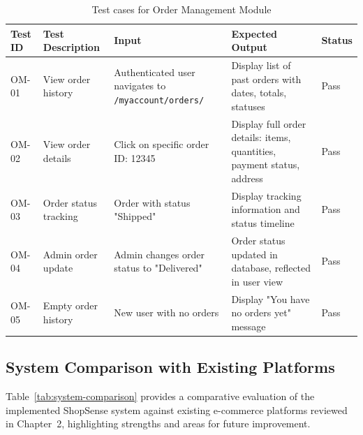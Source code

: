 \begin{table}[H]
\centering
\caption{Test cases for Order Management Module}
\label{tab:test-orders}
\small
\begin{tabular}{|p{1.3cm}|p{3.5cm}|p{3cm}|p{3.5cm}|p{1.2cm}|}
\hline
\textbf{Test ID} & \textbf{Test Description} & \textbf{Input} & \textbf{Expected Output} & \textbf{Status} \\
\hline
OM-01 & View order history & Authenticated user navigates to \texttt{/myaccount/orders/} & Display list of past orders with dates, totals, statuses & Pass \\
\hline
OM-02 & View order details & Click on specific order ID: 12345 & Display full order details: items, quantities, payment status, address & Pass \\
\hline
OM-03 & Order status tracking & Order with status "Shipped" & Display tracking information and status timeline & Pass \\
\hline
OM-04 & Admin order update & Admin changes order status to "Delivered" & Order status updated in database, reflected in user view & Pass \\
\hline
OM-05 & Empty order history & New user with no orders & Display "You have no orders yet" message & Pass \\
\hline
\end{tabular}
\end{table}

\subsection{System Comparison with Existing Platforms}

Table~\ref{tab:system-comparison} provides a comparative evaluation of the implemented ShopSense system against existing e-commerce platforms reviewed in Chapter~2, highlighting strengths and areas for future improvement.

